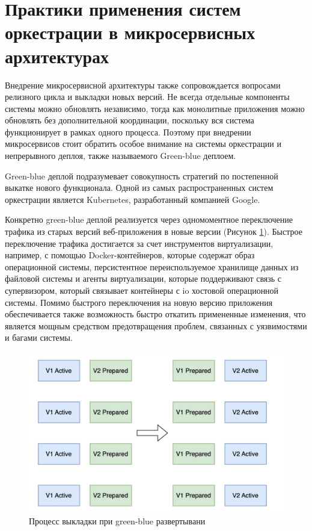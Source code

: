 \section{Практики применения систем оркестрации в микросервисных архитектурах}
Внедрение микросервисной архитектуры также сопровождается вопросами релизного цикла и выкладки новых версий. Не всегда отдельные компоненты 
системы можно обновлять независимо, тогда как монолитные приложения можно обновлять без дополнительной координации, поскольку вся
система функционирует в рамках одного процесса. Поэтому при внедрении микросервисов стоит обратить особое внимание на системы оркестрации
и непрерывного деплоя, также называемого Green-blue деплоем. 

Green-blue деплой подразумевает совокупность стратегий по постепенной выкатке нового функционала. Одной из
самых распространенных систем оркестрации является Kubernetes, разработанный компанией Google.

Конкретно green-blue деплой реализуется через одномоментное переключение трафика из старых версий веб-приложения
в новые версии (Рисунок \ref{fig:gb}). Быстрое переключение трафика достигается за счет инструментов виртуализации, например, с помощью Docker-контейнеров,
которые содержат образ операционной системы, персистентное переиспользуемое хранилище данных из файловой системы и агенты виртуализации, которые
поддерживают связь с супервизором, который связывает контейнеры с io хостовой операционной системы.
Помимо быстрого переключения на новую версию приложения обеспечивается также возможность быстро откатить
примененные изменения, что является мощным средством предотвращения проблем, связанных с уязвимостями и багами
системы. 
\begin{figure}[H]
    \centering
    \includegraphics[width=0.8\linewidth]{img/gb.jpg}
    \caption{Процесс выкладки при green-blue развертывани}
    \label{fig:gb}
\end{figure}

